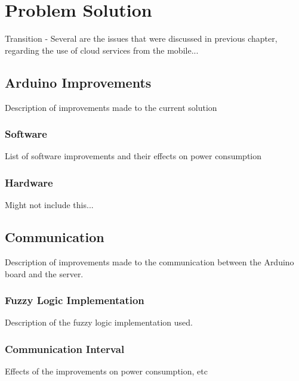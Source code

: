 
\chapter{Problem Solution} %

Transition - Several are the issues that were discussed in previous chapter, regarding the use of cloud services from the mobile...



\ifpdf
    \graphicspath{{X/figures/PNG/}{X/figures/PDF/}{X/figures/}}
\else
    \graphicspath{{X/figures/EPS/}{X/figures/}}
\fi


\section{Arduino Improvements}
Description of improvements made to the current solution

\subsection{Software}
List of software improvements and their effects on power consumption

\subsection{Hardware} 
Might not include this...

\section{Communication}
Description of improvements made to the communication between the Arduino board and the server.

\subsection{Fuzzy Logic Implementation}
Description of the fuzzy logic implementation used.

\subsection{Communication Interval}
Effects of the improvements on power consumption, etc



